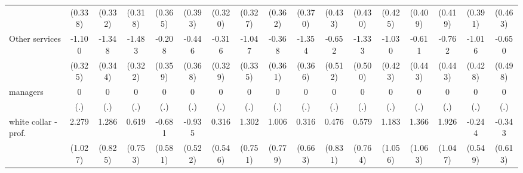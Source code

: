 {\begin{tabular}{l*{16}{c}}
                    &     (0.338)         &     (0.332)         &     (0.318)         &     (0.365)         &     (0.393)         &     (0.320)         &     (0.327)         &     (0.362)         &     (0.370)         &     (0.433)         &     (0.430)         &     (0.425)         &     (0.409)         &     (0.419)         &     (0.391)         &     (0.463)         \\
[1em]
Other services      &      -1.100\sym{***}&      -1.348\sym{***}&      -1.483\sym{***}&      -0.208         &      -0.446         &      -0.316         &      -1.047\sym{**} &      -0.368         &      -1.354\sym{***}&      -0.652         &      -1.333\sym{**} &      -1.030\sym{*}  &      -0.611         &      -0.762         &      -1.016\sym{*}  &      -0.650         \\
                    &     (0.325)         &     (0.344)         &     (0.322)         &     (0.359)         &     (0.368)         &     (0.329)         &     (0.335)         &     (0.361)         &     (0.366)         &     (0.512)         &     (0.500)         &     (0.423)         &     (0.443)         &     (0.443)         &     (0.428)         &     (0.498)         \\
[1em]
managers            &           0         &           0         &           0         &           0         &           0         &           0         &           0         &           0         &           0         &           0         &           0         &           0         &           0         &           0         &           0         &           0         \\
                    &         (.)         &         (.)         &         (.)         &         (.)         &         (.)         &         (.)         &         (.)         &         (.)         &         (.)         &         (.)         &         (.)         &         (.)         &         (.)         &         (.)         &         (.)         &         (.)         \\
[1em]
white collar - prof.&       2.279\sym{*}  &       1.286         &       0.619         &      -0.681         &      -0.935         &       0.316         &       1.302         &       1.006         &       0.316         &       0.476         &       0.579         &       1.183         &       1.366         &       1.926         &      -0.244         &      -0.343         \\
                    &     (1.027)         &     (0.825)         &     (0.753)         &     (0.581)         &     (0.522)         &     (0.546)         &     (0.751)         &     (0.779)         &     (0.663)         &     (0.831)         &     (0.764)         &     (1.056)         &     (1.063)         &     (1.047)         &     (0.549)         &     (0.613)         \\

\end{tabular}}
